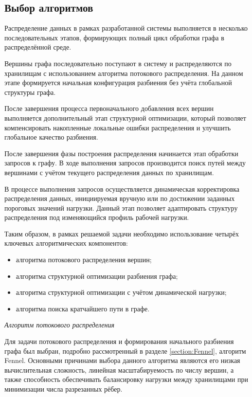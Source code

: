 \vspace{-12pt}
\subsection{Выбор алгоритмов}

Распределение данных в рамках разработанной системы выполняется в несколько последовательных этапов, формирующих полный цикл обработки графа в распределённой среде.

Вершины графа последовательно поступают в систему и распределяются по хранилищам с использованием алгоритма потокового распределения. На данном этапе формируется начальная конфигурация разбиения без учёта глобальной структуры графа.

После завершения процесса первоначального добавления всех вершин выполняется дополнительный этап структурной оптимизации, который позволяет компенсировать накопленные локальные ошибки распределения и улучшить глобальное качество разбиения.

После завершения фазы построения распределения начинается этап обработки запросов к графу. В ходе выполнения запросов производится поиск путей между вершинами с учётом текущего распределения данных по хранилищам.

В процессе выполнения запросов осуществляется динамическая корректировка распределения данных, инициируемая вручную или по достижении заданных пороговых значений нагрузки. Данный этап позволяет адаптировать структуру распределения под изменяющийся профиль рабочей нагрузки.


Таким образом, в рамках решаемой задачи необходимо использование четырёх ключевых алгоритмических компонентов:

\begin{itemize}
    \item алгоритма потокового распределения вершин;
    \item алгоритма структурной оптимизации разбиения графа;
    \item алгоритма структурной оптимизации с учётом динамической нагрузки;
    \item алгоритма поиска кратчайшего пути в графе.
\end{itemize}

\textit{Алгоритм потокового распределения}

Для задачи потокового распределения и формирования начального разбиения графа был выбран, подробно рассмотренный в разделе \ref{section:Fennel}, алгоритм Fennel. Основными причинами выбора данного алгоритма являются его низкая вычислительная сложность, линейная масштабируемость по числу вершин, а также способность обеспечивать балансировку нагрузки между хранилищами при минимизации числа разрезанных рёбер.

